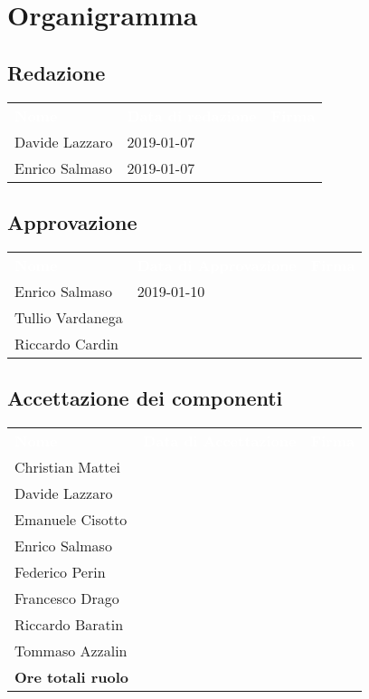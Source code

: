 \section{Organigramma}
\subsection{Redazione}
{
	\renewcommand{\arraystretch}{2}
	\centering
	\begin{longtable}{ C{5cm} C{4cm} C{5cm} }
		\textcolor{white}{\textbf{Nome}} & \textcolor{white}{\textbf{Data di redazione}} & \textcolor{white}{\textbf{Firma}}\\	
        
        Davide Lazzaro & 2019-01-07 &   \\
        Enrico Salmaso & 2019-01-07 &   \\
        		
	\end{longtable}
}

\subsection{Approvazione}
{
	\renewcommand{\arraystretch}{2}
	\centering
	\begin{longtable}{ C{5cm} C{4cm} C{5cm} }
		\textcolor{white}{\textbf{Nome}} & \textcolor{white}{\textbf{Data di Approvazione}} & \textcolor{white}{\textbf{Firma}}\\	
		
		
		Enrico Salmaso & 2019-01-10 &  \\
		Tullio Vardanega &  & \\
		Riccardo Cardin & &  \\
		
	\end{longtable}
}

\subsection{Accettazione dei componenti}
{
	\renewcommand{\arraystretch}{2}
	\centering
	\begin{longtable}{ C{5cm} C{4cm} C{5cm} }
		\textcolor{white}{\textbf{Nome}} & \textcolor{white}{\textbf{Data di Accettazione}} & \textcolor{white}{\textbf{Firma}}\\	
		
		
		Christian Mattei & & \\
		Davide Lazzaro & & \\
		Emanuele Cisotto & & \\
		Enrico Salmaso & &  \\
		Federico Perin & & \\
		Francesco Drago & &  \\
		Riccardo Baratin & &  \\
		Tommaso Azzalin & &  \\
		\textbf{Ore totali ruolo} & & \\
		
		
	\end{longtable}
}

